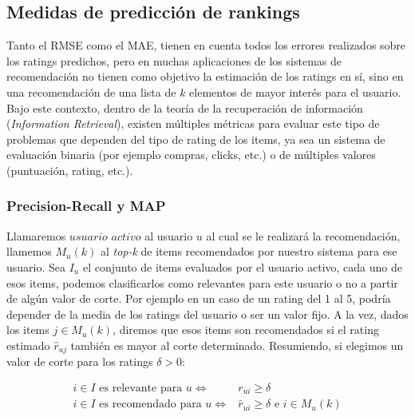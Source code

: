 \documentclass[hidelinks,12pt,a4paper]{book}
\theoremstyle{plain}
\theoremstyle{definition}
\begin{document}


\subsection{Medidas de predicción de rankings}

Tanto el RMSE como el MAE, tienen en cuenta todos los errores realizados sobre los ratings predichos, pero en muchas aplicaciones de los sistemas de recomendación no tienen como objetivo la estimación de los ratings en sí, sino en una recomendación de una lista de $k$ elementos de mayor interés para el usuario. Bajo este contexto, dentro de la teoría de la recuperación de información (\textit{Information Retrieval}), existen múltiples métricas para evaluar este tipo de problemas que dependen del tipo de rating de los items, ya sea un sistema de evaluación binaria (por ejemplo compras, clicks, etc.) o de múltiples valores (puntuación, rating, etc.).

\subsubsection{Precision-Recall y MAP}

Llamaremos $usuario$ $activo$ al usuario $u$ al cual se le realizará la recomendación, llamemos $M_u(k)$ al \textit{top-k} de items recomendados por nuestro sistema para ese usuario. Sea $I_u$ el conjunto de items evaluados por el usuario activo, cada uno de esos items, podemos clasificarlos como relevantes para este usuario o no a partir de algún valor de corte. Por ejemplo en un caso de un rating del 1 al 5, podría depender de la media de los ratings del usuario o ser un valor fijo. A la vez, dados los items $j\in M_u(k)$, diremos que esos items son recomendados si el rating estimado $\hat{r}_{uj}$ también es mayor al corte determinado. Resumiendo, si elegimos un valor de corte para los ratings $\delta > 0$:

\begin{eqnarray*}
i\in I \text{ es relevante para } u \Longleftrightarrow& r_{ui} \geq \delta \\
i \in I \text{ es recomendado para } u \Longleftrightarrow& \hat{r}_{ui} \geq \delta \text{ e } i \in M_u(k)
\end{eqnarray*}
\end{document}
